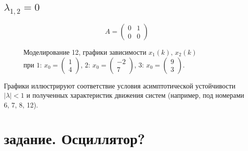 \documentclass[a5paper, 10pt]{article}
\theoremstyle{definition}
\theoremstyle{plain}
\theoremstyle{remark}
\begin{document}
\subsection{$\lambda_{1, 2} = 0$}
\begin{equation}
A =
\begin{pmatrix}
 0 &  1  \\
0 & 0
\end{pmatrix}
\end{equation}
\begin{figure}[h!]
\caption{Моделирование 12, графики зависимости $x_1 \left( k \right), \, x_2 \left( k \right)$ \\ при  $1: \, x_0 = \begin{pmatrix} 1 \\ 4 \end{pmatrix}$, $2: \, x_0 = \begin{pmatrix} -2 \\ 7 \end{pmatrix}$, $3: \, x_0 = \begin{pmatrix} 9 \\ 3 \end{pmatrix}$.}
\end{figure}

Графики иллюстрируют соответствие условия асимптотической устойчивости $ \left| \lambda \right| < 1$ и полученных характеристик движения систем (например, под номерами 6, 7, 8, 12).

\newpage
\section{задание. Осциллятор?}
\end{document}
